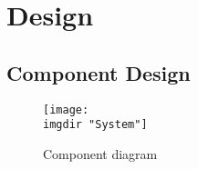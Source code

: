 \chapter{Design}
\noindent

\section{Component Design}

\begin{figure}
  \texttt{[image: \\imgdir "System"]}
  \caption{Component diagram}
  \label{fig:component_diagram}
\end{figure}

